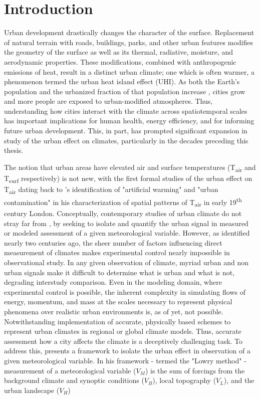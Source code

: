 \chapter{Introduction}
Urban development drastically changes the character of the surface. Replacement of natural terrain with roads, buildings, parks, and other urban features modifies the geometry of the surface as well as its thermal, radiative, moisture, and aerodynamic properties. These modifications, combined with anthropogenic emissions of heat, result in a distinct urban climate; one which is often warmer, a phenomenon termed the urban heat island effect (UHI). As both the Earth's population and the urbanized fraction of that population increase \citep{Nations2014}, cities grow and more people are exposed to urban-modified atmospheres. Thus, understanding how cities interact with the climate across spatiotemporal scales has important implications for human health, energy efficiency, and for informing future urban development. This, in part, has prompted significant expansion in study of the urban effect on climates, particularly in the decades preceding this thesis. 

The notion that urban areas have elevated air and surface temperatures (T\textsubscript{air} and T\textsubscript{surf} respectively) is not new, with the first formal studies of the urban effect on T\textsubscript{air} dating back to \citet{Howard1833}'s identification of "artificial warming" and "urban contamination" in his characterization of spatial patterns of T\textsubscript{air} in early 19\textsuperscript{th} century London. Conceptually, contemporary studies of urban climate do not stray far from \citet{Howard1833}, by seeking to isolate and quantify the urban signal in measured or modeled assessment of a given meteorological variable. However, as \citet{Howard1833} identified nearly two centuries ago, the sheer number of factors influencing direct measurement of climates makes experimental control nearly impossible in observational study. In any given observation of climate, myriad urban and non urban signals make it difficult to determine what is urban and what is not, degrading interstudy comparison. Even in the modeling domain, where experimental control is possible, the inherent complexity in simulating flows of energy, momentum, and mass at the scales necessary to represent physical phenomena over realistic urban environments is, as of yet, not possible. Notwithstanding implementation of accurate, physically based schemes to represent urban climates in regional or global climate models. Thus, accurate assessment how a city affects the climate is a deceptively challenging task. To address this, \citet{Lowry1977} presents a framework to isolate the urban effect in observation of a given meteorological variable. In his framework - termed the "Lowry method" - measurement of a meteorological variable ($V_M$) is the sum of forcings from the background climate and synoptic conditions ($V_B$), local topography ($V_L$), and the urban landscape ($V_H$)

